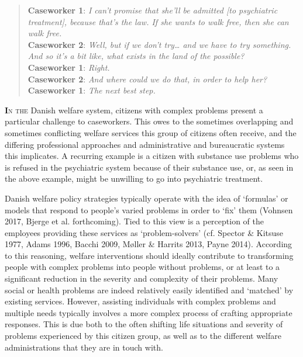 
    \blockquote{\normalfont \textbf{Caseworker 1}: \textit{I can’t promise that she’ll be admitted [to psychiatric treatment], because that’s the law. If she wants to walk free, then she can walk free.}
    \\\textbf{Caseworker 2}: \textit{Well, but if we don’t try… and we have to try something. And so it’s a bit like, what exists in the land of the possible?}
    \\\textbf{Caseworker 1}: \textit{Right.}
    \\\textbf{Caseworker 2}: \textit{And where could we do that, in order to help her?}
    \\\textbf{Caseworker 1}: \textit{The next best step.}}\columnbreak
\lettrine[lines=2]{\bfseries\color{black}I}{n the} Danish welfare system, citizens with complex problems present a particular challenge to caseworkers. This owes to the sometimes overlapping and sometimes conflicting welfare services this group of citizens often receive, and the differing professional approaches and administrative and bureaucratic systems this implicates. A recurring example is a citizen with substance use problems who is refused in the psychiatric system because of their substance use, or, as seen in the above example, might be unwilling to go into psychiatric treatment.
\par
Danish welfare policy strategies typically operate with the idea of ‘formulas’ or models that respond to people’s varied problems in order to ‘fix’ them (Vohnsen 2017, Bjerge et al. forthcoming). Tied to this view is a perception of the employees providing these services as ‘problem-solvers’ (cf. Spector \& Kitsuse 1977, Adams 1996, Bacchi 2009, Møller \& Harrits 2013, Payne 2014). According to this reasoning, welfare interventions should ideally contribute to transforming people with complex problems into people without problems, or at least to a significant reduction in the severity and complexity of their problems. Many social or health problems are indeed relatively easily identified and ‘matched’ by existing services. However, assisting individuals with complex problems and multiple needs typically involves a more complex process of crafting appropriate responses. This is due both to the often shifting life situations and severity of problems experienced by this citizen group, as well as to the different welfare administrations that they are in touch with.
